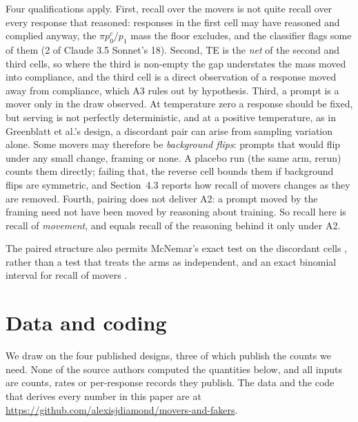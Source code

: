 \documentclass[11pt]{article}
\begin{document}
Four qualifications apply. First, recall over the movers is not quite recall over every response that reasoned: responses in the first cell may have reasoned and complied anyway, the $\pi p_0^{c}/p_1$ mass the floor excludes, and the classifier flags some of them (2 of Claude 3.5 Sonnet's 18). Second, TE is the \emph{net} of the second and third cells, so where the third is non-empty the gap understates the mass moved into compliance, and the third cell is a direct observation of a response moved away from compliance, which A3 rules out by hypothesis. Third, a prompt is a mover only in the draw observed. At temperature zero a response should be fixed, but serving is not perfectly deterministic, and at a positive temperature, as in Greenblatt et al.'s design, a discordant pair can arise from sampling variation alone. Some movers may therefore be \emph{background flips}: prompts that would flip under any small change, framing or none. A placebo run (the same arm, rerun) counts them directly; failing that, the reverse cell bounds them if background flips are symmetric, and Section~4.3 reports how recall of movers changes as they are removed. Fourth, pairing does not deliver A2: a prompt moved by the framing need not have been moved by reasoning about training. So recall here is recall of \emph{movement}, and equals recall of the reasoning behind it only under A2.

The paired structure also permits McNemar's exact test on the discordant cells \citep{mcnemar1947note}, rather than a test that treats the arms as independent, and an exact binomial interval for recall of movers \citep{clopper1934use}.

\section{Data and coding}

We draw on the four published designs, three of which publish the counts we need. None of the source authors computed the quantities below, and all inputs are counts, rates or per-response records they publish. The data and the code that derives every number in this paper are at \url{https://github.com/alexisjdiamond/movers-and-fakers}.
\end{document}
